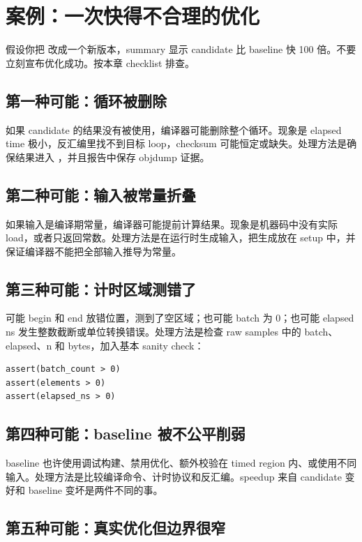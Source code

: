 \section{案例：一次快得不合理的优化}

假设你把  改成一个新版本，summary 显示 candidate 比 baseline 快 100 倍。不要立刻宣布优化成功。按本章 checklist 排查。

\subsection{第一种可能：循环被删除}

如果 candidate 的结果没有被使用，编译器可能删除整个循环。现象是 elapsed time 极小，反汇编里找不到目标 loop，checksum 可能恒定或缺失。处理方法是确保结果进入 ，并且报告中保存 objdump 证据。

\subsection{第二种可能：输入被常量折叠}

如果输入是编译期常量，编译器可能提前计算结果。现象是机器码中没有实际 load，或者只返回常数。处理方法是在运行时生成输入，把生成放在 setup 中，并保证编译器不能把全部输入推导为常量。

\subsection{第三种可能：计时区域测错了}

可能 begin 和 end 放错位置，测到了空区域；也可能 batch 为 0；也可能 elapsed ns 发生整数截断或单位转换错误。处理方法是检查 raw samples 中的 batch、elapsed、n 和 bytes，加入基本 sanity check：

\begin{lstlisting}
assert(batch_count > 0)
assert(elements > 0)
assert(elapsed_ns > 0)
\end{lstlisting}

\subsection{第四种可能：baseline 被不公平削弱}

baseline 也许使用调试构建、禁用优化、额外校验在 timed region 内、或使用不同输入。处理方法是比较编译命令、计时协议和反汇编。speedup 来自 candidate 变好和 baseline 变坏是两件不同的事。

\subsection{第五种可能：真实优化但边界很窄}

